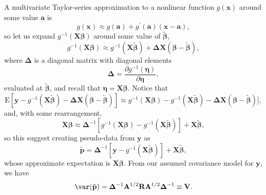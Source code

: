 \documentclass[12pt, titlepage]{article}
\begin{document}
A multivariate Taylor-series approximation to a nonlinear function $g(\mathbf{x})$ around some value $\mathbf{a}$ is
$$
g(\mathbf{x}) \approx g(\mathbf{a}) + g^{\prime}(\mathbf{a})(\mathbf{x} - \mathbf{a}),
$$
so let us expand $g^{-1}(\mathbf{X}\boldsymbol{\beta})$ around some value of $\tilde{\boldsymbol{\beta}}$,
$$
g^{-1}(\mathbf{\mathbf{X}\boldsymbol{\beta}}) \approx g^{-1}(\mathbf{X}\tilde{\boldsymbol{\beta}}) + \boldsymbol{\Delta}\mathbf{X}(\boldsymbol{\beta} - \tilde{\boldsymbol{\beta}}),
$$
where $\boldsymbol{\Delta}$ is a diagonal matrix with diagonal elements
$$
\boldsymbol{\Delta} = \frac{\partial g^{-1}(\boldsymbol{\eta})}{\partial \boldsymbol{\eta}},
$$
evaluated at $\tilde{\boldsymbol{\beta}}$, and recall that $\boldsymbol{\eta} = \mathbf{X}\boldsymbol{\beta}$.  Notice that
$$
\textrm{E}[\mathbf{y} - g^{-1}(\mathbf{X}\tilde{\boldsymbol{\beta}}) - \boldsymbol{\Delta}\mathbf{X}(\boldsymbol{\beta} - \tilde{\boldsymbol{\beta}})] \approx g^{-1}(\mathbf{X}\boldsymbol{\beta}) - g^{-1}(\mathbf{X}\tilde{\boldsymbol{\beta}}) - \boldsymbol{\Delta}\mathbf{X}(\boldsymbol{\beta} - \tilde{\boldsymbol{\beta}})],
$$
and, with some rearrangement,
$$
\mathbf{X}\boldsymbol{\beta} \approx \boldsymbol{\Delta}^{-1}[g^{-1}(\mathbf{X}\boldsymbol{\beta}) - g^{-1}(\mathbf{X}\tilde{\boldsymbol{\beta}})] + \mathbf{X}\tilde{\boldsymbol{\beta}},
$$
so this suggest creating pseudo-data from $\mathbf{y}$ as
\begin{equation} \label{eq:pseudodata}
\tilde{\mathbf{p}} = \boldsymbol{\Delta}^{-1}[\mathbf{y} - g^{-1}(\mathbf{X}\tilde{\boldsymbol{\beta}})] + \mathbf{X}\tilde{\boldsymbol{\beta}},
\end{equation}
whose approximate expectation is $\mathbf{X}\boldsymbol{\beta}$.  From our assumed covariance model for $\mathbf{y}$, we have 
$$
\var({\tilde{\mathbf{p}}}) = \boldsymbol{\Delta}^{-1}\mathbf{A}^{1/2}\mathbf{R}\mathbf{A}^{1/2}\boldsymbol{\Delta}^{-1} \equiv \mathbf{V}.
$$
\end{document}
